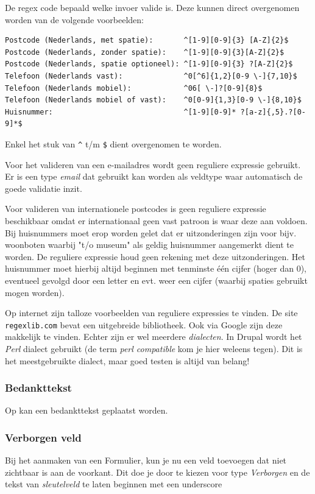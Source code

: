 De regex code bepaald welke invoer valide is. Deze kunnen direct overgenomen worden van de volgende voorbeelden:
\begin{verbatim}
Postcode (Nederlands, met spatie):       ^[1-9][0-9]{3} [A-Z]{2}$
Postcode (Nederlands, zonder spatie):    ^[1-9][0-9]{3}[A-Z]{2}$
Postcode (Nederlands, spatie optioneel): ^[1-9][0-9]{3} ?[A-Z]{2}$
Telefoon (Nederlands vast):              ^0[^6]{1,2}[0-9 \-]{7,10}$
Telefoon (Nederlands mobiel):            ^06[ \-]?[0-9]{8}$
Telefoon (Nederlands mobiel of vast):    ^0[0-9]{1,3}[0-9 \-]{8,10}$
Huisnummer:                              ^[1-9][0-9]* ?[a-z]{,5}.?[0-9]*$
\end{verbatim}
Enkel het stuk van \texttt{\^} t/m \texttt{\$} dient overgenomen te worden.

Voor het valideren van een e-mailadres wordt geen reguliere expressie gebruikt. Er is een type \emph{email} dat gebruikt kan worden als veldtype waar automatisch de goede validatie inzit.

Voor valideren van internationele postcodes is geen reguliere expressie beschikbaar omdat er internationaal geen vast patroon is waar deze aan voldoen. Bij huisnummers moet erop worden gelet dat er uitzonderingen zijn voor bijv. woonboten waarbij "t/o museum" als geldig huisnummer aangemerkt dient te worden. De reguliere expressie houd geen rekening met deze uitzonderingen. Het huisnummer moet hierbij altijd beginnen met tenminste \'{e}\'{e}n cijfer (hoger dan 0), eventueel gevolgd door een letter en evt. weer een cijfer (waarbij spaties gebruikt mogen worden).

Op internet zijn talloze voorbeelden van reguliere expressies te vinden. De site \texttt{regexlib.com} bevat een uitgebreide bibliotheek. Ook via Google zijn deze makkelijk te vinden. Echter zijn er wel meerdere \emph{dialecten}. In Drupal wordt het \emph{Perl} dialect gebruikt (de term \emph{perl compatible} kom je hier weleens tegen). Dit is het meestgebruikte dialect, maar goed testen is altijd van belang!

\subsubsection{Bedankttekst}
Op  kan een bedankttekst geplaatst worden.


\subsubsection{Verborgen veld}
Bij het aanmaken van een Formulier, kun je nu een veld toevoegen dat niet zichtbaar is aan de voorkant. Dit doe je door te kiezen voor type \emph{Verborgen} en de tekst van \emph{sleutelveld} te laten beginnen met een underscore  

